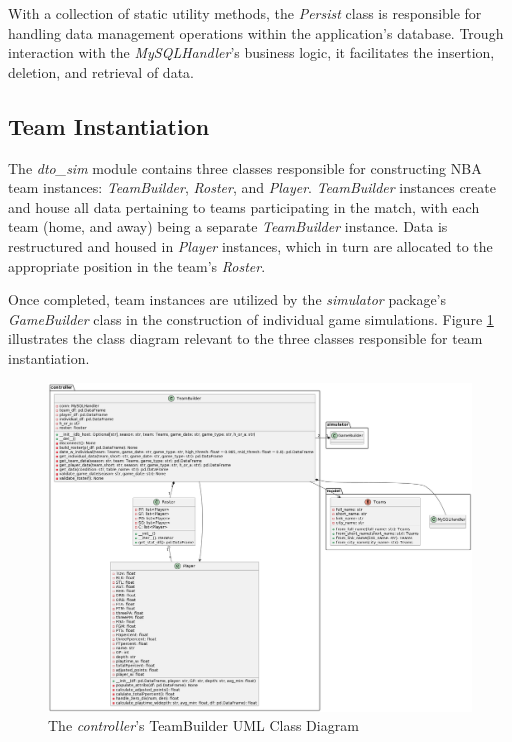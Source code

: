\documentclass{thesis-ekf}
\theoremstyle{definition}
\theoremstyle{remark}
\begin{document}
With a collection of static utility methods, the \emph{Persist} class is responsible for handling data management operations within the application's database. Trough interaction with the \emph{MySQLHandler}'s business logic, it facilitates the insertion, deletion, and retrieval of data.


\subsection{Team Instantiation}
The \emph{dto\_sim} module contains three classes responsible for constructing NBA team instances: \emph{TeamBuilder}, \emph{Roster}, and \emph{Player}. \emph{TeamBuilder} instances create and house all data pertaining to teams participating in the match, with each team (home, and away) being a separate \emph{TeamBuilder} instance. Data is restructured and housed in \emph{Player} instances, which in turn are allocated to the appropriate position in the team's \emph{Roster}.

Once completed, team instances are utilized by the \emph{simulator} package's \emph{GameBuilder} class in the construction of individual game simulations. Figure \ref{img-controller-teambuilder-class} illustrates the class diagram relevant to the three classes responsible for team instantiation.

\begin{figure}[th!]
	\centering
	\includegraphics[width=1\linewidth]{img/class/controller_teambuild}
	\caption{The \emph{controller}'s TeamBuilder UML Class Diagram}
	\label{img-controller-teambuilder-class}
\end{figure}
\end{document}
